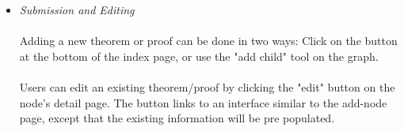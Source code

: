 \documentclass{acm_proc_article-sp}
\begin{document}
\begin{itemize}
\item \emph{Submission and Editing} \\\\
Adding a new theorem or proof can be done in two ways: 
Click on the button at the bottom of the index page, or use the "add child" tool on the graph. \\\\

Users can edit an existing theorem/proof by clicking the "edit" button on the node's detail page. The button links to an interface similar to the add-node page, except that the existing information will be pre populated. 


\end{itemize}
\end{document}
